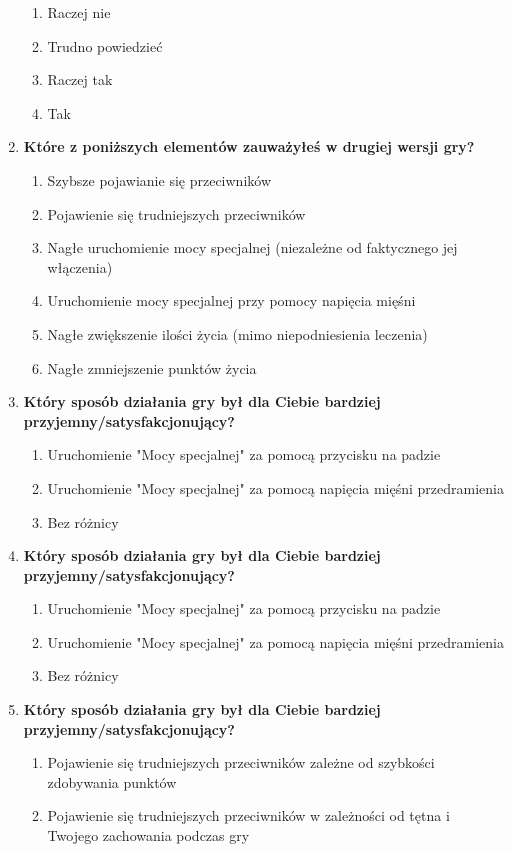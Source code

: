 \begin{enumerate}
\begin{enumerate}[label=(\alph*)]
		\item Raczej nie
		\item Trudno powiedzieć
		\item Raczej tak
		\item Tak
	\end{enumerate}
	\item \textbf{Które z poniższych elementów zauważyłeś w drugiej wersji gry?}
	\begin{enumerate}[label=(\alph*)]
		\item Szybsze pojawianie się przeciwników
		\item Pojawienie się trudniejszych przeciwników
		\item Nagłe uruchomienie mocy specjalnej (niezależne od faktycznego jej włączenia)
		\item Uruchomienie mocy specjalnej przy pomocy napięcia mięśni
		\item Nagłe zwiększenie ilości życia (mimo niepodniesienia leczenia)
		\item Nagłe zmniejszenie punktów życia
	\end{enumerate}
	\item \textbf{Który sposób działania gry był dla Ciebie bardziej przyjemny/satysfakcjonujący?}
	\begin{enumerate}[label=(\alph*)]
		\item Uruchomienie "Mocy specjalnej" za pomocą przycisku na padzie
		\item Uruchomienie "Mocy specjalnej" za pomocą napięcia mięśni przedramienia
		\item Bez różnicy
	\end{enumerate}
	\item \textbf{Który sposób działania gry był dla Ciebie bardziej przyjemny/satysfakcjonujący?}
	\begin{enumerate}[label=(\alph*)]
		\item Uruchomienie "Mocy specjalnej" za pomocą przycisku na padzie
		\item Uruchomienie "Mocy specjalnej" za pomocą napięcia mięśni przedramienia
		\item Bez różnicy
	\end{enumerate}
	\item \textbf{Który sposób działania gry był dla Ciebie bardziej przyjemny/satysfakcjonujący?}
	\begin{enumerate}[label=(\alph*)]
		\item Pojawienie się trudniejszych przeciwników zależne od szybkości zdobywania punktów
		\item Pojawienie się trudniejszych przeciwników w zależności od tętna i Twojego zachowania podczas gry

\end{enumerate}
\end{enumerate}
